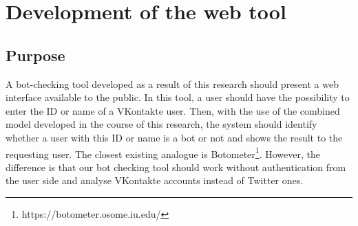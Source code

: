 \section{Development of the web tool}
\subsection{Purpose}
A bot-checking tool developed as a result of this research should present a
web interface available to the public. In this tool, a user should have the possibility to enter the ID or name of a VKontakte user. Then, with the use of the combined model developed in the course of this research, the system should identify whether a user with this ID or name is a bot or not and shows the result to the requesting user. The closest existing analogue is Botometer\footnote{https://botometer.osome.iu.edu/}. However, the difference is that our bot checking tool should work without authentication from the user side and analyse VKontakte accounts instead of Twitter ones.

